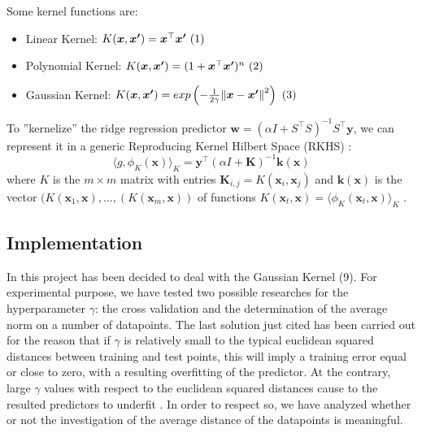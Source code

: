 \documentclass{article}
\begin{document}
Some kernel functions are:
\begin{itemize}
	\item Linear Kernel: $K(\boldsymbol{x},\boldsymbol{x^\prime}) = \boldsymbol{x}^\top\boldsymbol{x^\prime}\hfill
        \stepcounter{equation}\ (\theequation)$
	\item Polynomial Kernel: $K(\boldsymbol{x},\boldsymbol{x^\prime}) = (1 + \boldsymbol{x}^\top\boldsymbol{x^\prime})^n\hfill \stepcounter{equation}\ (\theequation)$
	\item Gaussian Kernel: 
        $K(\boldsymbol{x},\boldsymbol{x^\prime}) = exp \left(-\frac{1}{2\gamma}\norm{\boldsymbol{x}-\boldsymbol{x^\prime}}^2 \right)\hfill
        \stepcounter{equation}\ (\theequation)$
\end{itemize}
To ''kernelize'' the ridge regression predictor $\boldsymbol{w} = (\alpha I + S^\top S)^{-1}S^\top \boldsymbol{y}$, we can represent it in a generic Reproducing Kernel Hilbert Space (RKHS) \cite{rhks}: 
\begin{equation}
	\label{KRR}\langle{g,\phi_K(\boldsymbol{x})}\rangle_K = \boldsymbol{y^\top}(\alpha I + \boldsymbol{K})^{-1} \boldsymbol{k}(\boldsymbol{x})
\end{equation} 
where $K$ is the $m \times m$ matrix with entries $\boldsymbol{K}_{i,j} = K(\boldsymbol{x}_i,\boldsymbol{x}_j)$ and $\boldsymbol{k}(\boldsymbol{x})$ is the vector $(K(\boldsymbol{x}_1, \boldsymbol{x}), \dots, (K(\boldsymbol{x}_m, \boldsymbol{x}))$ of functions $K(\boldsymbol{x}_t, \boldsymbol{x}) = \langle{\phi_K(\boldsymbol{x}_t, \boldsymbol{x})}\rangle_K$ 
\cite{profk}.

\subsection{Implementation}
\label{kernelimpl}
In this project has been decided to deal with the Gaussian Kernel (9).
For experimental purpose, we have tested two possible researches for the hyperparameter $\gamma$: the cross validation and the determination of the average norm on a number of datapoints. The last solution just cited has been carried out for the reason that if $\gamma$ is relatively small to the typical euclidean squared distances between training and test points, this will imply a training error equal or close to zero, with a resulting overfitting of the predictor. At the contrary, large $\gamma$ values with respect to the euclidean squared distances cause to the resulted predictors to underfit \cite{profk}. In order to respect so, we have analyzed whether or not the investigation of the average distance of the datapoints is meaningful.\newline
\end{document}
